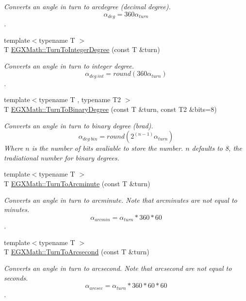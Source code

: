 \begin{DoxyCompactItemize}
\begin{DoxyCompactList}\small\item\em Converts an angle in turn to arcdegree (decimal degree). \[\alpha_{deg}=360\alpha_{turn}\]. \end{DoxyCompactList}\item 
{\footnotesize template$<$typename T $>$ }\\T \mbox{\hyperlink{group___e_g_x_math-_conversions-_angle_conversions-_turn_ga999085c62490997da870618e20e88ebb}{E\+G\+X\+Math\+::\+Turn\+To\+Integer\+Degree}} (const T \&turn)
\begin{DoxyCompactList}\small\item\em Converts an angle in turn to integer degree. \[\alpha_{deg\ int}=round(360\alpha_{turn})\]. \end{DoxyCompactList}\item 
{\footnotesize template$<$typename T , typename T2 $>$ }\\T \mbox{\hyperlink{group___e_g_x_math-_conversions-_angle_conversions-_turn_ga678efb8f5c3958351fc3f1dfaf117b28}{E\+G\+X\+Math\+::\+Turn\+To\+Binary\+Degree}} (const T \&turn, const T2 \&bits=8)
\begin{DoxyCompactList}\small\item\em Converts an angle in turn to binary degree (brad). \[\alpha_{deg\ bin}=round(2^{(n-1)}\alpha_{turn})\] Where $n$ is the number of bits avaliable to store the number. $n$ defaults to 8, the tradiational number for binary degrees. \end{DoxyCompactList}\item 
{\footnotesize template$<$typename T $>$ }\\T \mbox{\hyperlink{group___e_g_x_math-_conversions-_angle_conversions-_turn_ga72cda928d9043c7d82097b1a7920769e}{E\+G\+X\+Math\+::\+Turn\+To\+Arcminute}} (const T \&turn)
\begin{DoxyCompactList}\small\item\em Converts an angle in turn to arcminute. Note that arcminutes are not equal to minutes. \[\alpha_{arcmin}=\alpha_{turn} * 360 * 60\]. \end{DoxyCompactList}\item 
{\footnotesize template$<$typename T $>$ }\\T \mbox{\hyperlink{group___e_g_x_math-_conversions-_angle_conversions-_turn_gaad072969abc59ef6f5b63ac6a176a11b}{E\+G\+X\+Math\+::\+Turn\+To\+Arcsecond}} (const T \&turn)
\begin{DoxyCompactList}\small\item\em Converts an angle in turn to arcsecond. Note that arcsecond are not equal to seconds. \[\alpha_{arcsec}=\alpha_{turn} * 360 * 60 * 60\]. \end{DoxyCompactList}\item 

\end{DoxyCompactItemize}
